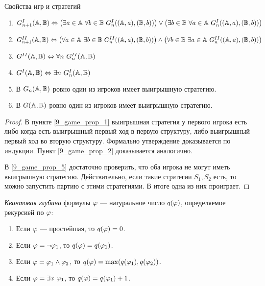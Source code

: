 \begin{prop}
    Свойства игр и стратегий
    \begin{enumerate}
        \item \label{9_game_prop_1} $G_{n+1}^I({\mathbb A}, {\mathbb B}) \Leftrightarrow \left( \exists a\in{\mathbb A}~\forall b\in{\mathbb B}~G_n^I(({\mathbb A}, a), ({\mathbb B}, b))\right)
                                    \vee\left( \exists b\in{\mathbb B}~\forall a\in{\mathbb A}~G_n^I(({\mathbb A}, a), ({\mathbb B}, b))\right) $
        \item \label{9_game_prop_2} $G_{n+1}^{II}({\mathbb A}, {\mathbb B}) \Leftrightarrow \left( \forall a\in{\mathbb A}~\exists b\in{\mathbb B}~G_n^{II}(({\mathbb A}, a), ({\mathbb B}, b))\right)
                                                \wedge\left( \forall b\in{\mathbb B}~\exists a\in{\mathbb A}~G_n^{II}(({\mathbb A}, a), ({\mathbb B}, b))\right) $

        \item \label{9_game_prop_3} $G^{II}({\mathbb A}, {\mathbb B}) \Leftrightarrow \forall n~G_n^{II}({\mathbb A}, {\mathbb B})$
        \item \label{9_game_prop_4} $G^{I}({\mathbb A}, {\mathbb B}) \Leftrightarrow \exists n~G_n^{I}({\mathbb A}, {\mathbb B})$

        \item \label{9_game_prop_5} В $G_n({\mathbb A}, {\mathbb B})$ ровно один из игроков имеет выигрышную стратегию.
        \item \label{9_game_prop_6} В $G ({\mathbb A}, {\mathbb B})$ ровно один из игроков имеет выигрышную стратегию.
    \end{enumerate}
\end{prop}
\begin{proof}
    В пункте \ref{9_game_prop_1} выигрышная стратегия у первого игрока есть либо когда есть выигрышный первый ход в первую структуру, либо выигрышный первый ход во вторую структуру. Формально утверждение доказывается по индукции. Пункт \ref{9_game_prop_2} доказывается аналогично.

    В \ref{9_game_prop_5} достаточно проверить, что оба игрока не могут иметь выигрышную стратегию. Действительно, если такие стратегии $S_1, S_2$ есть, то можно запустить партию с этими стратегиями. В итоге одна из них проиграет.
\end{proof}

\begin{definition}
    \emph{Квантовая глубина} формулы $\varphi$ — натуральное число $q(\varphi)$, определяемое рекурсией по $\varphi$:
    \begin{enumerate}
        \item Если $\varphi$ — простейшая, то $q(\varphi)=0$.
        \item Если $\varphi=\neg\varphi_1$, то $q(\varphi)=q(\varphi_1)$.
        \item Если $\varphi=\varphi_1\wedge\varphi_2$, то $q(\varphi)=\max(q(\varphi_1), q(\varphi_2))$.
        \item Если $\varphi=\exists x~\varphi_1$, то $q(\varphi) = q(\varphi_1)+1$.
    \end{enumerate}
\end{definition}

